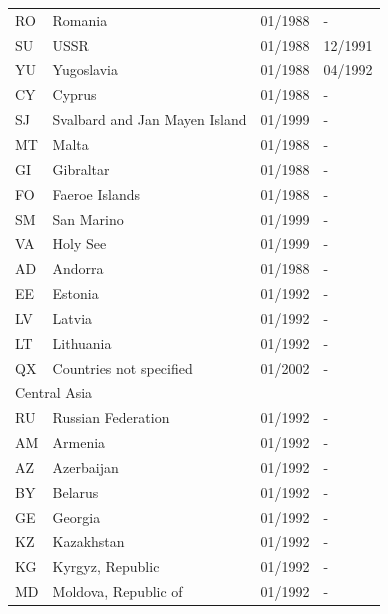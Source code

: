 \begin{small}
\begin{longtable}{p{0.5cm}p{9cm}p{2cm}p{2cm}}
RO	&	Romania	&	01/1988	&	-	\\

SU	&	USSR	&	01/1988	&	12/1991	\\

YU	&	Yugoslavia	&	01/1988	&	04/1992	\\

CY	&	Cyprus	&	01/1988	&	-	\\

SJ	&	Svalbard and Jan Mayen Island	&	01/1999	&	-	\\

MT	&	Malta	&	01/1988	&	-	\\

GI	&	Gibraltar	&	01/1988	&	-	\\

FO	&	Faeroe Islands	&	01/1988	&	-	\\

SM	&	San Marino	&	01/1999	&	-	\\

VA	&	Holy See	&	01/1999	&	-	\\

AD	&	Andorra	&	01/1988	&	-	\\

EE	&	Estonia	&	01/1992	&	-	\\

LV	&	Latvia	&	01/1992	&	-	\\

LT	&	Lithuania	&	01/1992	&	-	\\
QX	&	Countries not specified	&	01/2002	&	-	\\
\midrule
\multicolumn{3}{l}{Central Asia}	&	\\
RU	&	Russian Federation	&	01/1992	&	-	\\

AM	&	Armenia	&	01/1992	&	-	\\

AZ	&	Azerbaijan	&	01/1992	&	-	\\

BY	&	Belarus	&	01/1992	&	-	\\

GE	&	Georgia	&	01/1992	&	-	\\

KZ	&	Kazakhstan	&	01/1992	&	-	\\

KG	&	Kyrgyz, Republic	&	01/1992	&	-	\\

MD	&	Moldova, Republic of	&	01/1992	&	-	\\


\end{longtable}
\end{small}
